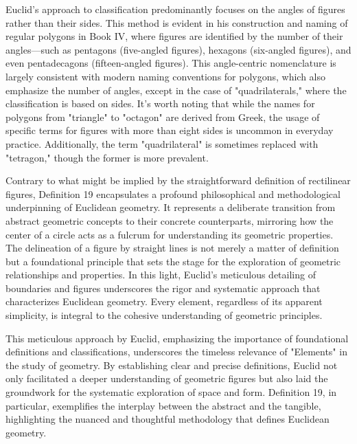 Euclid's approach to classification predominantly focuses on the angles of figures rather than their sides. This method is evident in his construction and naming of regular polygons in Book IV, where figures are identified by the number of their angles—such as pentagons (five-angled figures), hexagons (six-angled figures), and even pentadecagons (fifteen-angled figures). This angle-centric nomenclature is largely consistent with modern naming conventions for polygons, which also emphasize the number of angles, except in the case of "quadrilaterals," where the classification is based on sides. It's worth noting that while the names for polygons from "triangle" to "octagon" are derived from Greek, the usage of specific terms for figures with more than eight sides is uncommon in everyday practice. Additionally, the term "quadrilateral" is sometimes replaced with "tetragon," though the former is more prevalent.

Contrary to what might be implied by the straightforward definition of rectilinear figures, Definition 19 encapsulates a profound philosophical and methodological underpinning of Euclidean geometry. It represents a deliberate transition from abstract geometric concepts to their concrete counterparts, mirroring how the center of a circle acts as a fulcrum for understanding its geometric properties. The delineation of a figure by straight lines is not merely a matter of definition but a foundational principle that sets the stage for the exploration of geometric relationships and properties. In this light, Euclid's meticulous detailing of boundaries and figures underscores the rigor and systematic approach that characterizes Euclidean geometry. Every element, regardless of its apparent simplicity, is integral to the cohesive understanding of geometric principles.

This meticulous approach by Euclid, emphasizing the importance of foundational definitions and classifications, underscores the timeless relevance of "Elements" in the study of geometry. By establishing clear and precise definitions, Euclid not only facilitated a deeper understanding of geometric figures but also laid the groundwork for the systematic exploration of space and form. Definition 19, in particular, exemplifies the interplay between the abstract and the tangible, highlighting the nuanced and thoughtful methodology that defines Euclidean geometry.



\clearpage